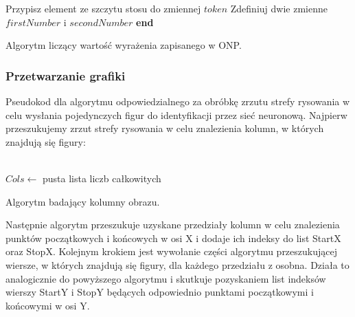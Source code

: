 \documentclass[12pt,a4paper]{article}
\begin{document}
    \begin{algorithm}[H]
        Przypisz element ze szczytu stosu do zmiennej $token$\;
        Zdefiniuj dwie zmienne $firstNumber$ i $secondNumber$\;
        \textbf{end}
        \caption{Algorytm liczący wartość wyrażenia zapisanego w ONP.}
    \end{algorithm}
    
\vspace{40pt}
\subsubsection*{Przetwarzanie grafiki}
\hspace{20pt} Pseudokod dla algorytmu odpowiedzialnego za obróbkę zrzutu strefy rysowania w celu wysłania pojedynczych figur do identyfikacji przez sieć neuronową. Najpierw przeszukujemy zrzut strefy rysowania w celu znalezienia kolumn, w których znajdują się figury: \\ \\
\begin{algorithm}[H]
\vspace{5pt}
$Cols \leftarrow$ pusta lista liczb całkowitych\;
\vspace{5pt}
\caption{Algorytm badający kolumny obrazu.}
\end{algorithm}

\vspace{20pt} Następnie algorytm przeszukuje uzyskane przedziały kolumn w celu znalezienia punktów początkowych i końcowych w osi X i dodaje ich indeksy do list StartX oraz StopX. Kolejnym krokiem jest wywołanie części algorytmu przeszukującej wiersze, w których znajdują się figury, dla każdego przedziału z osobna. Działa to analogicznie do powyższego algorytmu i skutkuje pozyskaniem list indeksów wierszy StartY i StopY będących odpowiednio punktami początkowymi i końcowymi w osi Y.
\end{document}
